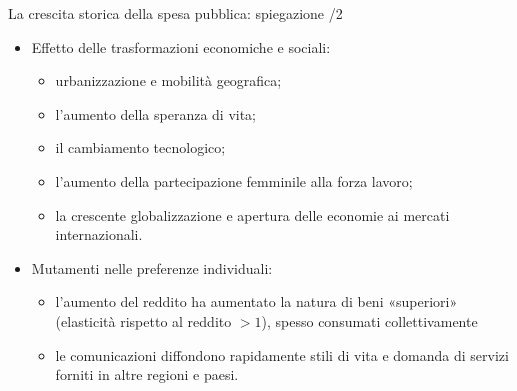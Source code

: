 \documentclass[aspectratio=64,12pt]{beamer}
\begin{document}
\begin{frame}{La crescita storica della spesa pubblica: spiegazione /2}
\begin{itemize}
\item Effetto delle trasformazioni economiche e sociali:
\begin{itemize}
\item urbanizzazione e mobilità geografica;
\item l’aumento della speranza di vita;
\item il cambiamento tecnologico;
\item l’aumento della partecipazione femminile alla forza lavoro;
\item la crescente globalizzazione e apertura delle economie ai mercati internazionali.
\end{itemize}
\item Mutamenti nelle preferenze individuali:
\begin{itemize}
\item l’aumento del reddito ha aumentato la natura di beni «superiori» (elasticità rispetto al reddito $> 1$), spesso  consumati collettivamente
\item le comunicazioni diffondono rapidamente stili di vita e domanda di servizi forniti in altre regioni e paesi.
\end{itemize}
\end{itemize}
\end{frame}
\end{document}
